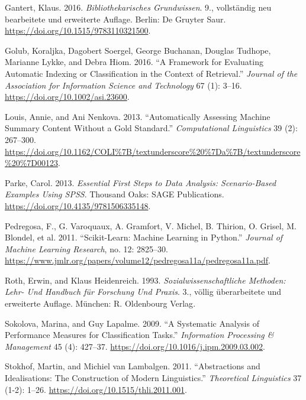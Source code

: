 \hypertarget{refs}{}
\begin{CSLReferences}{1}{0}
\leavevmode\hypertarget{ref-Gantert.2016}{}%
Gantert, Klaus. 2016. \emph{Bibliothekarisches Grundwissen}. 9.,
vollst{ä}ndig neu bearbeitete und erweiterte Auflage. Berlin: {De
Gruyter Saur}. \url{https://doi.org/10.1515/9783110321500}.

\leavevmode\hypertarget{ref-Golub.2016}{}%
Golub, Koraljka, Dagobert Soergel, George Buchanan, Douglas Tudhope,
Marianne Lykke, and Debra Hiom. 2016. {``A Framework for Evaluating
Automatic Indexing or Classification in the Context of Retrieval.''}
\emph{Journal of the Association for Information Science and Technology}
67 (1): 3--16. \url{https://doi.org/10.1002/asi.23600}.

\leavevmode\hypertarget{ref-Louis.2013}{}%
Louis, Annie, and Ani Nenkova. 2013. {``Automatically Assessing Machine
Summary Content Without a Gold Standard.''} \emph{Computational
Linguistics} 39 (2): 267--300.
\url{https://doi.org/10.1162/COLI\%7B/textunderscore\%20\%7Da\%7B/textunderscore\%20\%7D00123}.

\leavevmode\hypertarget{ref-Parke.2013}{}%
Parke, Carol. 2013. \emph{Essential First Steps to Data Analysis:
Scenario-Based Examples Using SPSS}. Thousand Oaks: {SAGE Publications}.
\url{https://doi.org/10.4135/9781506335148}.

\leavevmode\hypertarget{ref-Pedregosa.2011}{}%
Pedregosa, F., G. Varoquaux, A. Gramfort, V. Michel, B. Thirion, O.
Grisel, M. Blondel, et al. 2011. {``Scikit-Learn: Machine Learning in
Python.''} \emph{Journal of Machine Learning Research}, no. 12:
2825--30.
\url{https://www.jmlr.org/papers/volume12/pedregosa11a/pedregosa11a.pdf}.

\leavevmode\hypertarget{ref-Roth.1993}{}%
Roth, Erwin, and Klaus Heidenreich. 1993. \emph{Sozialwissenschaftliche
Methoden: Lehr- Und Handbuch f{ü}r Forschung Und Praxis}. 3., v{ö}llig
{ü}berarbeitete und erweiterte Auflage. M{ü}nchen: {R. Oldenbourg
Verlag}.

\leavevmode\hypertarget{ref-Sokolova.2009}{}%
Sokolova, Marina, and Guy Lapalme. 2009. {``A Systematic Analysis of
Performance Measures for Classification Tasks.''} \emph{Information
Processing {\&} Management} 45 (4): 427--37.
\url{https://doi.org/10.1016/j.ipm.2009.03.002}.

\leavevmode\hypertarget{ref-Stokhof.2011}{}%
Stokhof, Martin, and Michiel van Lambalgen. 2011. {``Abstractions and
Idealisations: The Construction of Modern Linguistics.''}
\emph{Theoretical Linguistics} 37 (1-2): 1--26.
\url{https://doi.org/10.1515/thli.2011.001}.


\end{CSLReferences}
